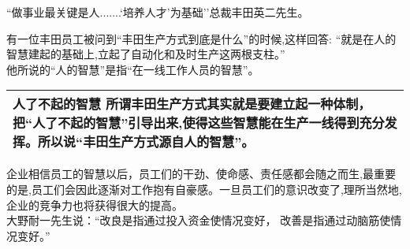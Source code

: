 \documentclass[]{article}
\providecommand{\tightlist}{%
  \setlength{\itemsep}{0pt}\setlength{\parskip}{0pt}}
\begin{document}
\begin{description}
\tightlist
\item[]
``做事业最关键是人.......`培养人才'为基础''总裁丰田英二先生。
\end{description}

\begin{description}
\tightlist
\item[]
有一位丰田员工被问到``丰田生产方式到底是什么''的时候,这样回答:
``就是在人的智慧建起的基础上,立起了自动化和及时生产这两根支柱。''\\

他所说的``人的智慧''是指``在一线工作人员的智慧''。\\
\end{description}

\begin{longtable}[]{@{}l@{}}
\toprule
\endhead
\textbf{人了不起的智慧}
所谓丰田生产方式其实就是要建立起一种体制，把``人了不起的智慧''引导出来,使得这些智慧能在生产一线得到充分发挥。所以说``丰田生产方式源自人的智慧''。\tabularnewline
\bottomrule
\end{longtable}

企业相信员工的智慧以后，员工们的干劲、使命感、责任感都会随之而生,最重要的是,员工们会因此逐渐对工作抱有自豪感。一旦员工们的意识改变了,理所当然地,企业的竞争力也将获得很大的提高。\\
大野耐一先生说：``改良是指通过投入资金使情况变好，
改善是指通过动脑筋使情况变好。''
\end{document}
